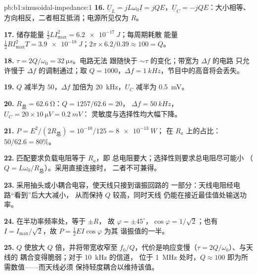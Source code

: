 \begin{solution}{pb:b1:sinusoidal-impedance:1}
\textbf{16.} $\underline U_L = jL\omega_0\underline I = jQE$，$\underline U_C
= -jQE$：大小相等、方向相反，二者相互抵消；电源所见仅为 $R$。

\textbf{17.} 储存能量 $\tfrac12 LI_{\max}^2 = \qty{6.2e-17}{J}$；每周期耗散
能量 $\tfrac12 RI_{\max}^2T = \qty{3.9e-18}{J}$；$2\pi \times 6.2/0.39
\approx 100 = Q$。

\textbf{18.} $\tau = 2Q/\omega_0 = \qty{32}{\micro s}$。电路无法
跟随快于 $\sim\tau$ 的变化；带宽为 $\Delta f$ 的电路
只允许慢于 $\Delta f$ 的调制通过；取 $Q = 1000$，$\Delta f =
\qty{1}{kHz}$，节目中的高音将会丢失。

\textbf{19.} $Q$ 减半为 $50$，$\Delta f$ 加倍为 \qty{20}{kHz}，$U_C$
减半为 \qty{0.5}{mV}。

\textbf{20.} $R_{\text{总}} = \qty{62.6}{\ohm}$：$Q = 1257/62.6 = 20$，
$\Delta f = \qty{50}{kHz}$，$U_C = 20 \times \qty{10}{\micro V} = \qty{0.2}{mV}$：
灵敏度与选择性均大幅下降。

\textbf{21.} $P = E^2/(2R_{\text{总}}) = 10^{-10}/125 = \qty{8e-13}{W}$；
在 $R_a$ 上的占比：$50/62.6 = 80\%$。

\textbf{22.} 匹配要求负载电阻等于 $R_a$，即
总电阻要大；选择性则要求总电阻尽可能小
（$Q = L\omega_0/R_{\text{总}}$）。采用直接连接时，
二者不可兼得。

\textbf{23.} 采用抽头或小耦合电容，使天线只接到谐振回路的
一部分：天线电阻经电路“看到”后大大减小，
从而保持 $Q$ 较高，同时天线
仍能在接近最佳值处输送功率。

\textbf{24.} 在半功率频率处，等于 $\pm R$，
故 $\varphi = \pm45^\circ$，$\cos\varphi = 1/\sqrt2$；也有 $I =
I_{\max}/\sqrt2$，故 $P = \tfrac12 EI\cos\varphi$ 为其
谐振值的一半。

\textbf{25.} $Q$ 使放大 $Q$ 倍，并将带宽收窄至
$f_0/Q$，代价是响应变慢（$\tau = 2Q/\omega_0$）、与天线的
耦合变得脆弱；对于 \qty{10}{kHz} 的信道，
位于 \qty{1}{MHz} 处时，$Q \approx 100$ 即为所需数值——而天线必须
保持轻度耦合以维持该值。
\end{solution}
